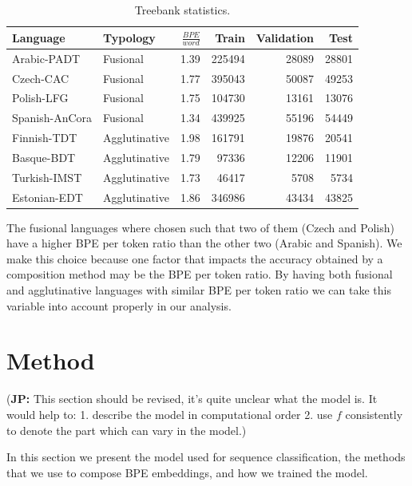 \documentclass[11pt]{article}
\newcommand\jp[1]{(\textbf{JP:} #1)}
\begin{document}
    	\begin{table} %
		\centering
		\begin{tabular}{l|lrrrr}
			Language & Typology & $\frac{BPE}{word}$ & Train & Validation & Test \\
			\hline
			Arabic-PADT  & Fusional & 1.39 & 225494 & 28089 & 28801  \\
			Czech-CAC   & Fusional & 1.77 & 395043 & 50087 & 49253 \\
			Polish-LFG & Fusional & 1.75 & 104730 & 13161 & 13076 \\
			Spanish-AnCora & Fusional & 1.34 & 439925 & 55196 & 54449 \\
			Finnish-TDT & Agglutinative & 1.98 & 161791 & 19876 & 20541 \\
			Basque-BDT  & Agglutinative & 1.79 & 97336 & 12206 & 11901 \\
			Turkish-IMST & Agglutinative & 1.73 & 46417 & 5708 & 5734 \\
			Estonian-EDT & Agglutinative & 1.86 & 346986 & 43434 & 43825 \\
		\end{tabular}
		\caption{\label{tab:data} Treebank statistics.}
	\end{table}
    
        The fusional languages where chosen such that two of them
        (Czech and Polish) have a higher BPE per token ratio than the
        other two (Arabic and Spanish). We make this choice because
        one factor that impacts the accuracy obtained by a composition
        method may be the BPE per token ratio.  By having both
        fusional and agglutinative languages with similar BPE per
        token ratio we can take this variable into account properly in
        our analysis.

	\section{Method}
	\label{method}
        \jp{This section should be revised, it's quite unclear what
          the model is. It would help to: 1. describe the model in
          computational order 2. use $f$ consistently to denote the
          part which can vary in the model.}
        
	In this section we present the model used for sequence
        classification, the methods that we use to compose BPE
        embeddings, and how we trained the model.
	
\end{document}
